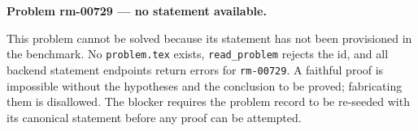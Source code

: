 \documentclass{article}
\begin{document}
\noindent\textbf{Problem rm-00729 --- no statement available.}

\medskip
\noindent
This problem cannot be solved because its statement has not been provisioned
in the benchmark. No \texttt{problem.tex} exists, \texttt{read\_problem} rejects
the id, and all backend statement endpoints return errors for \texttt{rm-00729}.
A faithful proof is impossible without the hypotheses and the conclusion to be
proved; fabricating them is disallowed. The blocker requires the problem record
to be re-seeded with its canonical statement before any proof can be attempted.
\end{document}
